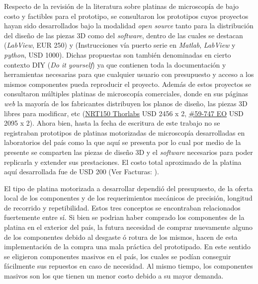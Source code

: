 Respecto de la revisión de la literatura sobre platinas de microscopía de bajo costo y factibles para el prototipo, se consultaron  los prototipos cuyos proyectos hayan sido desarrollados bajo la modalidad \textit{open source} tanto para la distribución del diseño de las piezas 3D como del \textit{software}, dentro de las cuales se destacan \cite{schaa}(\textit{LabView}, EUR 250) y \cite{campbells}(Instrucciones vía puerto serie en \textit{Matlab}, \textit{LabView} y \textit{python}, USD 1000). Dichas propuestas son también denominadas en cierto contexto DIY (\textit{Do it yourself}) ya que contienen toda la documentación y herramientas necesarias para que cualquier usuario con presupuesto y acceso a los mismos componentes pueda reproducir el proyecto. Además de estos proyectos se consultaron múltiples platinas de microscopía comerciales, donde en sus páginas \textit{web} la mayoría de los fabricantes distribuyen los planos de diseño, las piezas 3D libres para modificar, etc (\href{https://www.thorlabs.com/newgrouppage9.cfm?objectgroup\_id=2132}{NRT150 Thorlabs} USD 2456 x 2, \href{https://www.edmundoptics.com/p/150mm-motorized-stage/16419/}{\#59-747 EO} USD 2095 x 2). Ahora bien, hasta la fecha de escritura de este trabajo no se registraban prototipos de platinas motorizadas de microscopía desarrolladas en laboratorios del país como la que aquí se presenta por lo cual por medio de la presente se comparten las piezas de diseño 3D y el \textit{software} necesarios para poder replicarla y extender sus prestaciones. El costo total aproximado de la platina aquí desarrollada fue de USD 200 (Ver Facturas: \href{https://github.com/jrr1984/open\_frame\_XYStage/tree/master/Facturas\_costos}{\faMoneyCheck}).

El tipo de platina motorizada a desarrollar dependió del presupuesto, de la oferta local de los componentes y de los requerimientos mecánicos de precisión, longitud de recorrido y repetibilidad. Estos tres conceptos se encontraban relacionados fuertemente entre sí. Si bien se podrian haber comprado los componentes de la platina en el exterior del país, la futura necesidad de comprar nuevamente alguno de los componentes debido al desgaste ó rotura de los mismos, hacen de esta implementación de la compra una mala práctica del prototipado. En este sentido se eligieron componentes masivos en el país, los cuales se podían conseguir fácilmente sus repuestos en caso de necesidad. Al mismo tiempo, los componentes masivos son los que tienen un menor costo debido a su mayor demanda.

